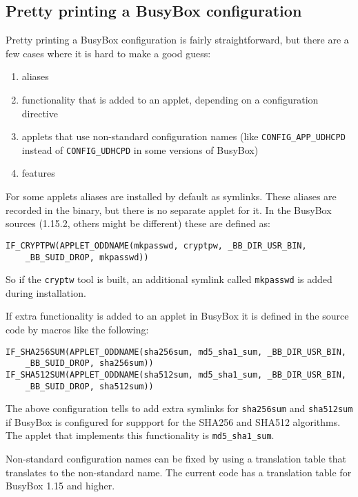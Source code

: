 \documentclass[10pt]{article}
\begin{document}
\subsection{Pretty printing a BusyBox configuration}

Pretty printing a BusyBox configuration is fairly straightforward, but there
are a few cases where it is hard to make a good guess:

\begin{enumerate}
\item aliases
\item functionality that is added to an applet, depending on a configuration
directive
\item applets that use non-standard configuration names (like
\texttt{CONFIG\_APP\_UDHCPD} instead of \texttt{CONFIG\_UDHCPD} in some
versions of BusyBox)
\item features
\end{enumerate}

For some applets aliases are installed by default as symlinks. These aliases
are recorded in the binary, but there is no separate applet for it. In the
BusyBox sources (1.15.2, others might be different) these are defined as:

\begin{verbatim}
IF_CRYPTPW(APPLET_ODDNAME(mkpasswd, cryptpw, _BB_DIR_USR_BIN,
    _BB_SUID_DROP, mkpasswd))
\end{verbatim}

So if the \texttt{cryptw} tool is built, an additional symlink called
\texttt{mkpasswd} is added during installation.

If extra functionality is added to an applet in BusyBox it is defined in the
source code by macros like the following:

\begin{verbatim}
IF_SHA256SUM(APPLET_ODDNAME(sha256sum, md5_sha1_sum, _BB_DIR_USR_BIN,
    _BB_SUID_DROP, sha256sum))
IF_SHA512SUM(APPLET_ODDNAME(sha512sum, md5_sha1_sum, _BB_DIR_USR_BIN,
    _BB_SUID_DROP, sha512sum))
\end{verbatim}

The above configuration tells to add extra symlinks for \texttt{sha256sum} and
\texttt{sha512sum} if BusyBox is configured for suppport for the SHA256 and
SHA512 algorithms. The applet that implements this functionality is
\texttt{md5\_sha1\_sum}.

Non-standard configuration names can be fixed by using a translation table that
translates to the non-standard name. The current code has a translation table
for BusyBox 1.15 and higher.
\end{document}
